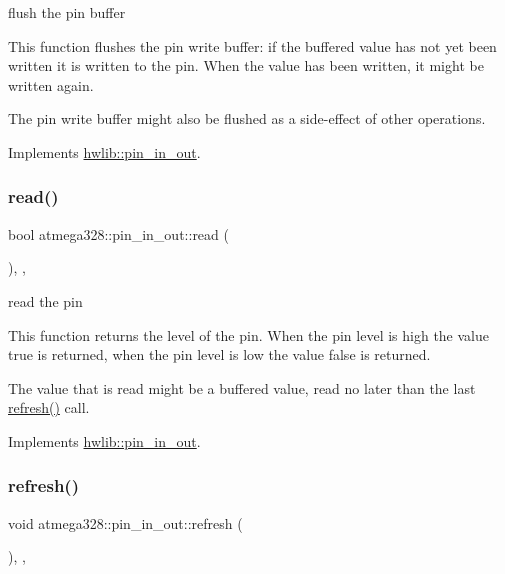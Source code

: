 flush the pin buffer

This function flushes the pin write buffer\+: if the buffered value has not yet been written it is written to the pin. When the value has been written, it might be written again.

The pin write buffer might also be flushed as a side-\/effect of other operations. 

Implements \hyperlink{classhwlib_1_1pin__in__out_a5207c9e30f0c88e4c052952397c2da88}{hwlib\+::pin\+\_\+in\+\_\+out}.

\mbox{\label{classatmega328_1_1pin__in__out_ad30bd54f54fd54163ffb97e59ab52498}} 
\subsubsection{\texorpdfstring{read()}{read()}}
{\footnotesize\ttfamily bool atmega328\+::pin\+\_\+in\+\_\+out\+::read (\begin{DoxyParamCaption}{ }\end{DoxyParamCaption})\hspace{0.3cm}{\ttfamily [inline]}, {\ttfamily [override]}, {\ttfamily [virtual]}}

read the pin

This function returns the level of the pin. When the pin level is high the value true is returned, when the pin level is low the value false is returned.

The value that is read might be a buffered value, read no later than the last \hyperlink{classatmega328_1_1pin__in__out_ad335cf418492a0631cbd1e0d25e9d0a6}{refresh()} call. 

Implements \hyperlink{classhwlib_1_1pin__in__out_a5caebc7ab9fe49b7e020b89f0a2cf892}{hwlib\+::pin\+\_\+in\+\_\+out}.

\mbox{\label{classatmega328_1_1pin__in__out_ad335cf418492a0631cbd1e0d25e9d0a6}} 
\subsubsection{\texorpdfstring{refresh()}{refresh()}}
{\footnotesize\ttfamily void atmega328\+::pin\+\_\+in\+\_\+out\+::refresh (\begin{DoxyParamCaption}{ }\end{DoxyParamCaption})\hspace{0.3cm}{\ttfamily [inline]}, {\ttfamily [override]}, {\ttfamily [virtual]}}

